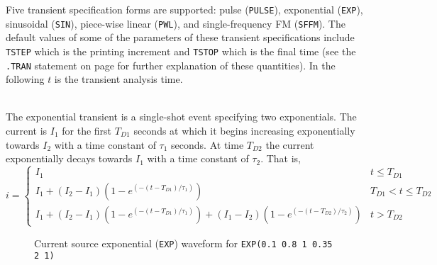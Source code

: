 
Five transient specification forms are supported:
pulse ({\tt PULSE}),  exponential ({\tt EXP}),  sinusoidal ({\tt SIN}),
piece-wise  linear ({\tt PWL}),   and
single-frequency FM ({\tt SFFM}).  The default values of some of the parameters
of these transient specifications include
{\tt TSTEP} which is the printing increment and {\tt TSTOP} which is the
final time (see the {\tt .TRAN} statement on page \pageref{.TRANstatement}
for further explanation of these quantities).
In the following $t$ is the transient analysis time.

\\[0.2in]
\vspace{-0.5in}
The exponential transient is a single-shot event specifying two exponentials.
The current is
$I_1$ for the first $T_{D1}$ seconds at which it begins increasing exponentially
towards $I_2$ with a time constant of $\tau_1$ seconds.  At time
$T_{D2}$ the current exponentially decays towards $I_1$ with a time constant
of $\tau_2$. That is,
\begin{equation}
i = \left\{ \begin{array}{ll}
     I_1                                           & t \le T_{D1}\\
     I_1+(I_2-I_1)(1-e^{\textstyle (-(t-T_{D1})/\tau_1)})  & T_{D1} < t \le T_{D2}\\
     I_1+(I_2-I_1)(1-e^{\textstyle (-(t-T_{D1})/\tau_1)})
        +(I_1-I_2)(1-e^{\textstyle (-(t-T_{D2})/\tau_2)})  &  t > T_{D2}
     \end{array} \right. %
\end{equation}
\vspace*{-0.2in}
\begin{figure}[hbp]
\centering

\caption[Current source exponential ({\tt EXP}) waveform]
{Current source exponential ({\tt EXP}) waveform for {\tt EXP(0.1 0.8 1 0.35 2 1)}
\label{fig:iexp} }
\end{figure}

